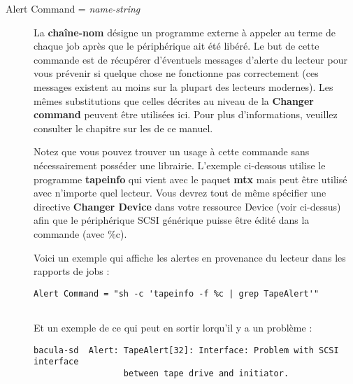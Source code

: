 \begin{description}
\item [Alert Command = {\it name-string}]
   La {\bf cha\^ine-nom} d\'esigne un programme externe \`a appeler au terme 
   de chaque job apr\`es que le p\'eriph\'erique ait \'et\'e lib\'er\'e. Le but de cette 
   commande est de r\'ecup\'erer d'\'eventuels messages d'alerte du lecteur pour 
   vous pr\'evenir si quelque chose ne fonctionne pas correctement (ces messages 
   existent au moins sur la plupart des lecteurs modernes). Les m\^emes 
   substitutions que celles d\'ecrites au niveau de la {\bf Changer command} 
   peuvent \^etre utilis\'ees ici. Pour plus d'informations, veuillez consulter 
   le chapitre sur les  de ce manuel.

   Notez que vous pouvez trouver un usage \`a cette commande sans n\'ecessairement 
   poss\'eder une librairie. L'exemple ci-dessous utilise le programme {\bf tapeinfo} 
   qui vient avec le paquet {\bf mtx} mais peut \^etre utilis\'e avec n'importe quel 
   lecteur. Vous devrez tout de m\^eme sp\'ecifier une directive {\bf Changer Device} 
   dans votre ressource Device (voir ci-dessus) afin que le p\'eriph\'erique SCSI 
   g\'en\'erique puisse \^etre \'edit\'e dans la commande (avec \%c).

   Voici un exemple qui affiche les alertes en provenance du lecteur dans les 
   rapports de jobs :
   
\footnotesize
\begin{verbatim}
Alert Command = "sh -c 'tapeinfo -f %c | grep TapeAlert'"
      
\end{verbatim}
\normalsize

Et un exemple de ce qui peut en sortir lorqu'il y a un probl\`eme :

\footnotesize
\begin{verbatim}
bacula-sd  Alert: TapeAlert[32]: Interface: Problem with SCSI interface
                  between tape drive and initiator.
      
\end{verbatim}
\normalsize


\end{description}
